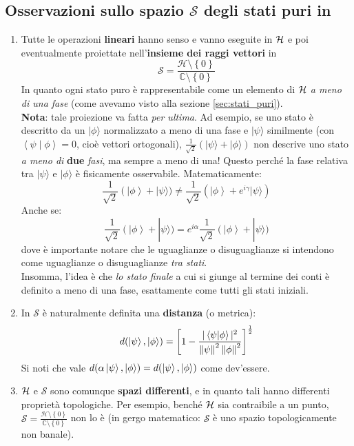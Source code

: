 \documentclass[FisicaTeorica.tex]{subfiles}
\begin{document}
\subsection{Osservazioni sullo spazio $\mathcal{S}$ degli stati puri in \MQ}
\begin{enumerate}
    \item Tutte le operazioni \textbf{lineari} hanno senso e vanno eseguite in $\mathcal{H}$ e poi eventualmente proiettate nell'\textbf{insieme dei raggi vettori} in 
    \[ \mathcal{S}=\frac{\mathcal{H}\setminus\left\{0\right\}}{\mathbb{C}\setminus\left\{0\right\}} \]
    In quanto ogni stato puro è rappresentabile come un elemento di $\mathcal{H}$ \textit{a meno di una fase} (come avevamo visto alla sezione \ref{sec:stati_puri}).\\
    \textbf{Nota}: tale proiezione va fatta \textit{per ultima}. Ad esempio, se uno stato è descritto da un $|\phi \rangle$  normalizzato a meno di una fase e $|\psi \rangle$ similmente (con $\left\langle\psi\middle|\phi\right\rangle=0$, cioè vettori ortogonali), $\frac{1}{\sqrt2}(|\psi \rangle +|\phi \rangle )$ non descrive uno stato \textit{a meno di } \textbf{due} \textit{fasi}, ma sempre a meno di una! Questo perché la fase relativa tra $|\psi \rangle$  e $|\phi \rangle$ è fisicamente osservabile. Matematicamente:
	\[
	\frac{1}{\sqrt2}\left(|\phi\right\rangle+|\psi \rangle )\neq \frac{1}{\sqrt2}(\left|\phi\right\rangle+e^{i\gamma}|\psi \rangle )
	\]
	Anche se:
	\[ \frac{1}{\sqrt2}\left(|\phi\right\rangle+|\psi \rangle )=e^{i\alpha}\frac{1}{\sqrt2}\left(|\phi\right\rangle+|\psi \rangle )
	\]
	dove è importante notare che le uguaglianze o disuguaglianze si intendono come uguaglianze o disuguaglianze \textit{tra stati}.\\
	Insomma, l'idea è che \textit{lo stato finale} a cui si giunge al termine dei conti è definito a meno di una fase, esattamente come tutti gli stati iniziali.
\item In $\mathcal{S}$ è naturalmente definita una \textbf{distanza} (o metrica):
\[
d(\ket{\psi},\ket{\phi}) = \left [ 1-\frac{|\braket{\psi|\phi}|^2}{\left\lVert\psi\right\rVert^2 \left\lVert\phi\right\rVert^2}\right]^{\frac{1}{2}}
\]
Si noti che vale $d(\alpha\ket{\psi}, \ket{\phi}) = d(\ket{\psi},\ket{\phi})$ come dev'essere.
\item $\mathcal{H}$ e $\mathcal{S}$ sono comunque \textbf{spazi differenti}, e in quanto tali hanno differenti proprietà topologiche. Per esempio, benché $\mathcal{H}$ sia contraibile a un punto, $\mathcal{S}=\frac{\mathcal{H}\setminus\left\{0\right\}}{\mathbb{C}\setminus\left\{0\right\}}$ non lo è (in gergo matematico: $\mathcal S$ è uno spazio topologicamente non banale).\\

\end{enumerate}
\end{document}
